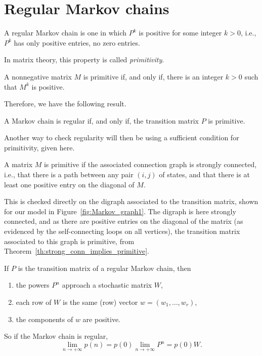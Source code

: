 \section{Regular Markov chains}
\begin{definition}
A regular Markov chain is one in which $P^k$ is positive for some integer $k>0$, i.e., $P^k$ has only positive entries, no zero entries.
\end{definition}
In matrix theory, this property is called \emph{primitivity}.
\begin{definition}
A nonnegative matrix $M$ is primitive if, and only if, there is an integer $k>0$ such that $M^k$ is positive.
\end{definition}
Therefore, we have the following result.
\begin{theorem}
A Markov chain is regular if, and only if, the transition matrix $P$ is primitive.
\end{theorem}
Another way to check regularity will then be using a sufficient condition for primitivity, given here.
\begin{theorem}\label{th:strong_conn_implies_primitive}
A matrix $M$ is primitive if the associated connection graph is strongly connected, i.e., that there is a path between any pair $(i,j)$ of states, and that there is at least one positive entry on the diagonal of $M$.
\end{theorem}
This is checked directly on the digraph associated to the transition matrix, shown for our model in Figure~\ref{fig:Markov_graph1}. The digraph is here strongly connected, and as there are positive entries on the diagonal of the matrix (as evidenced by the self-connecting loops on all vertices), the transition matrix associated to this graph is primitive, from Theorem~\ref{th:strong_conn_implies_primitive}.



\begin{theorem}
\label{th:limit_Markov_regular}
If $P$ is the transition matrix of a regular Markov chain, then
\begin{enumerate}
\item the powers $P^n$ approach a stochastic matrix $W$,
\item each row of $W$ is the same (row) vector $w=(w_1,\ldots,w_r)$,
\item the components of $w$ are positive.
\end{enumerate}
\end{theorem}
So if the Markov chain is regular,
\begin{equation}\label{eq:limit_Markov_regular}
\lim_{n\rightarrow +\infty}p(n)=p(0)\lim_{n\rightarrow +\infty}P^n
=p(0)W.
\end{equation}




